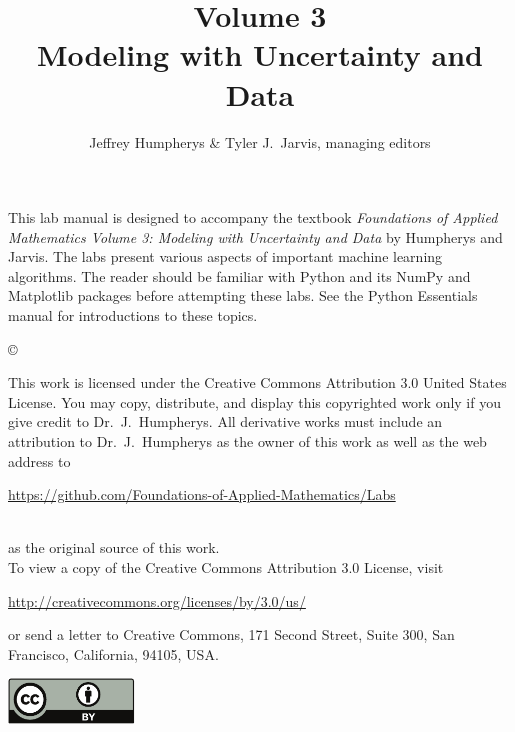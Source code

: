 \documentclass[opener-c,labs,yellow,nociteref]{HJnewsiambook}
\title{Volume 3\\ Modeling with Uncertainty and Data}
\author{Jeffrey Humpherys \& Tyler J.~Jarvis, managing editors}
\begin{document}

\thispagestyle{empty} %
\maketitle
\thispagestyle{empty}
\frontmatter



\begin{thepreface} %

This lab manual is designed to accompany the textbook \emph{Foundations of Applied Mathematics Volume 3: Modeling with Uncertainty and Data} by Humpherys and Jarvis.
The labs present various aspects of important machine learning algorithms.
The reader should be familiar with Python \cite{vanrossum2010python} and its NumPy \cite{oliphant2006guide,ascher2001numerical,oliphant2007python} and Matplotlib \cite{Hunter:2007} packages before attempting these labs.
See the Python Essentials manual for introductions to these topics.

\vfill
\copyright{This work is licensed under the Creative Commons Attribution 3.0 United States License.
You may copy, distribute, and display this copyrighted work only if you give credit to Dr.~J.~Humpherys.
All derivative works must include an attribution to Dr.~J.~Humpherys as the owner of this work as well as the web address to
\\
\centerline{\url{https://github.com/Foundations-of-Applied-Mathematics/Labs}}
\\
as the original source of this work.
\\
To view a copy of the Creative Commons Attribution 3.0 License, visit
\\
\centerline{\url{http://creativecommons.org/licenses/by/3.0/us/}}
or send a letter to Creative Commons, 171 Second Street, Suite 300, San Francisco, California, 94105, USA.}

\vfill
\centering\includegraphics[height=1.2cm]{by.pdf}
\vfill
\end{thepreface}

\setcounter{tocdepth}{1}
\tableofcontents

\mainmatter %
\end{document}
